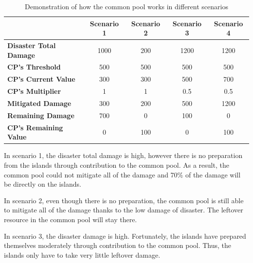 \begin{table}[!htb]
\begin{center}
\begin{tabular}{|l|c|c|c|c|}
\hline
                               & \textbf{Scenario 1} & \textbf{Scenario 2} & \textbf{Scenario 3} & \textbf{Scenario 4} \\ \hline
\textbf{Disaster Total Damage} & 1000                & 200                 & 1200                & 1200                \\ \hline
\textbf{CP's Threshold}        & 500                 & 500                 & 500                 & 500                 \\ \hline
\textbf{CP's Current Value}    & 300                 & 300                 & 500                 & 700                 \\ \hline
\textbf{CP's Multiplier}       & 1                   & 1                   & 0.5                 & 0.5                 \\ \hline
\textbf{Mitigated Damage}      & 300                 & 200                 & 500                 & 1200                \\ \hline
\textbf{Remaining Damage}      & 700                 & 0                   & 100                 & 0                   \\ \hline
\textbf{CP's Remaining Value}  & 0                   & 100                 & 0                   & 100                 \\ \hline
\end{tabular}
\end{center}
\caption{Demonstration of how the common pool works in different scenarios}
\label{tab:Demonstration of how the common pool works in different scenarios}
\end{table}

In scenario 1, the disaster total damage is high, however there is no preparation from the islands through contribution to the common pool. As a result, the common pool could not mitigate all of the damage and 70\% of the damage will be directly on the islands.

In scenario 2, even though there is no preparation, the common pool is still able to mitigate all of the damage thanks to the low damage of disaster. The leftover resource in the common pool will stay there.

In scenario 3, the disaster damage is high. Fortunately, the islands have prepared themselves moderately through contribution to the common pool. Thus, the islands only have to take very little leftover damage.

